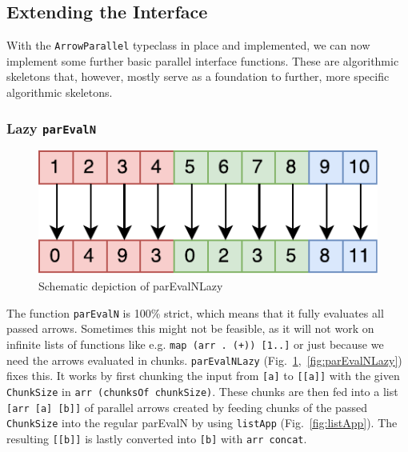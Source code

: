 \documentclass{jfp1}
\newcommand{\inlinecode}[1]{\texttt{#1}}
\begin{document}
	\subsection{Extending the Interface}
\label{sec:extending-interface}
With the \inlinecode{ArrowParallel} typeclass in place and implemented, we can now implement some further basic parallel interface functions. These are algorithmic skeletons that, however, mostly serve as a foundation to further, more specific algorithmic skeletons.

\subsubsection{Lazy \inlinecode{parEvalN}}
\begin{figure}[h]
	\includegraphics[scale=0.7]{images/parEvalNLazy}
	\caption{Schematic depiction of parEvalNLazy}
	\label{fig:parEvalNLazyImg}
\end{figure}
The function \inlinecode{parEvalN} is 100\% strict, which means that it fully evaluates all passed arrows. Sometimes this might not be feasible, as it will not work on infinite lists of functions like e.g. \inlinecode{map (arr . (+)) [1..]} or just because we need the arrows evaluated in chunks. \inlinecode{parEvalNLazy} (Fig.~\ref{fig:parEvalNLazyImg},~\ref{fig:parEvalNLazy}) fixes this. It works by first chunking the input from \inlinecode{[a]} to \inlinecode{[[a]]} with the given \inlinecode{ChunkSize} in \inlinecode{arr (chunksOf chunkSize)}. These chunks are then fed into a list \inlinecode{[arr [a] [b]]} of parallel arrows created by feeding chunks of the passed \inlinecode{ChunkSize} into the regular parEvalN by using \inlinecode{listApp} (Fig.~\ref{fig:listApp}). The resulting \inlinecode{[[b]]} is lastly converted into \inlinecode{[b]} with \inlinecode{arr concat}.
\end{document}
